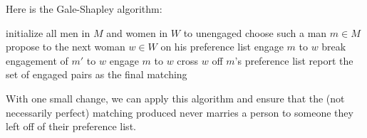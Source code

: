 \documentclass[11pt, oneside]{article}   	%
\theoremstyle{definition}
\theoremstyle{remark}
\begin{document}
Here is the Gale-Shapley algorithm:
  \begin{algorithmic}[1]
    \State initialize all men in $M$ and women in $W$ to unengaged
      \State choose such a man $m \in M$
      \State propose to the next woman $w \in W$ on his preference list
        \State engage $m$ to $w$
        \State break engagement of $m'$ to $w$
        \State engage $m$ to $w$
      \EndIf
      \State cross $w$ off $m$'s preference list
    \EndWhile
    \State report the set of engaged pairs as the final matching
  \EndProcedure
  \end{algorithmic}
With one small change, we can apply this algorithm and ensure that the
(not necessarily perfect) matching produced never marries a person to
someone they left off of their preference list.
\end{document}
